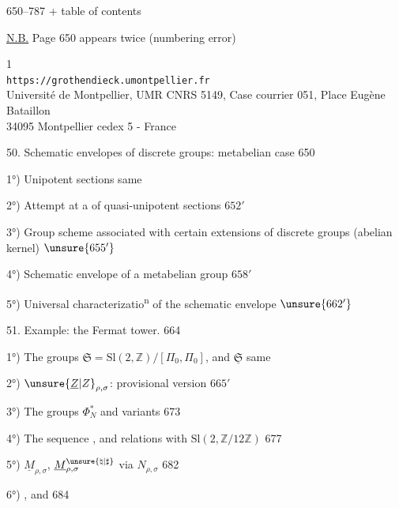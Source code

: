 
 650--787 + table of contents

\uline{N.B.} Page 650 appears twice (numbering error)


\begin{center}
\small
1\\
\texttt{https://grothendieck.umontpellier.fr}\\
Université de Montpellier, UMR CNRS 5149, Case courrier 051, Place Eugène Bataillon\\
34095 Montpellier cedex 5 - France
\end{center}

50. Schematic envelopes of discrete groups: metabelian case \hfill 650

1°) Unipotent sections \hfill same

2°) Attempt at a  of quasi-unipotent sections \hfill $652'$

3°) Group scheme associated with certain extensions of discrete groups (abelian kernel) \hfill $\unsure{655'}$

4°) Schematic envelope of a metabelian group \hfill $658'$

5°) Universal characterizatio\textsuperscript{n} of the schematic envelope \hfill $\unsure{662'}$

51. Example: the Fermat tower. \hfill 664

1°) The groups $\mathfrak S=\mathrm{Sl}(2,\mathbb Z)/[\Pi_0,\Pi_0]$, and $\underline{\mathfrak S}$ \hfill same

2°) $\unsure{\underline Z|Z}_{\rho,\sigma}$: provisional version \hfill $665'$

3°) The groups $\Phi_N^*$ and variants \hfill 673

4°) The sequence
,
and relations with $\mathrm{Sl}(2,\mathbb Z/12\mathbb Z)$ \hfill 677

5°) $\underline M_{\rho,\sigma}$, $\underline M^{\unsure{\natural|\sharp}}_{\rho,\sigma}$ via $N_{\rho,\sigma}$ \hfill 682

6°)  
,
and
\hfill 684

